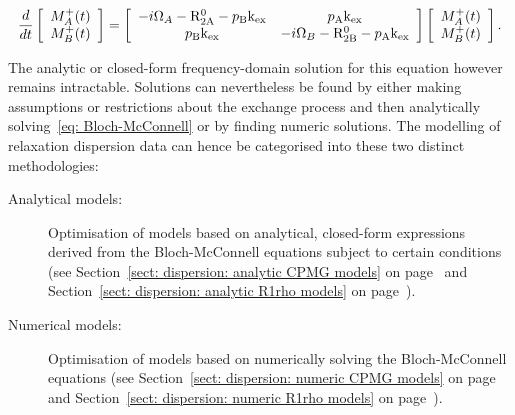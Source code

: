\begin{equation} \label{eq: Bloch-McConnell}
    \frac{d}{dt} \left[ 
        \begin{array}{c}
            M_A^+(t) \\
            M_B^+(t)
        \end{array}
    \right] = \left[
        \begin{array}{cc}
            -i\Omega_A-\mathrm{R}_\mathrm{2A}^0-p_\textrm{B}\textrm{k}_\textrm{ex} & p_\textrm{A}\textrm{k}_\textrm{ex} \\
            p_\textrm{B}\textrm{k}_\textrm{ex} & -i\Omega_B-\mathrm{R}_\mathrm{2B}^0-p_\textrm{A}\textrm{k}_\textrm{ex} \\
        \end{array}
    \right] \left[
        \begin{array}{c}
            M_A^+(t) \\
            M_B^+(t)
        \end{array}
    \right] .
\end{equation}

The analytic or closed-form frequency-domain solution for this equation however remains intractable.
Solutions can nevertheless be found by either making assumptions or restrictions about the exchange process and then analytically solving~\ref{eq: Bloch-McConnell} or by finding numeric solutions.
The modelling of relaxation dispersion data can hence be categorised into these two distinct methodologies:

\begin{description}
\item[Analytical models:]  Optimisation of models based on analytical, closed-form expressions derived from the Bloch-McConnell equations subject to certain conditions (see Section~\ref{sect: dispersion: analytic CPMG models} on page~\pageref{sect: dispersion: analytic CPMG models} and Section~\ref{sect: dispersion: analytic R1rho models} on page~\pageref{sect: dispersion: analytic R1rho models}).
\item[Numerical models:]  Optimisation of models based on numerically solving the Bloch-McConnell equations (see Section~\ref{sect: dispersion: numeric CPMG models} on page~\pageref{sect: dispersion: numeric CPMG models} and Section~\ref{sect: dispersion: numeric R1rho models} on page~\pageref{sect: dispersion: numeric R1rho models}).
\end{description}





